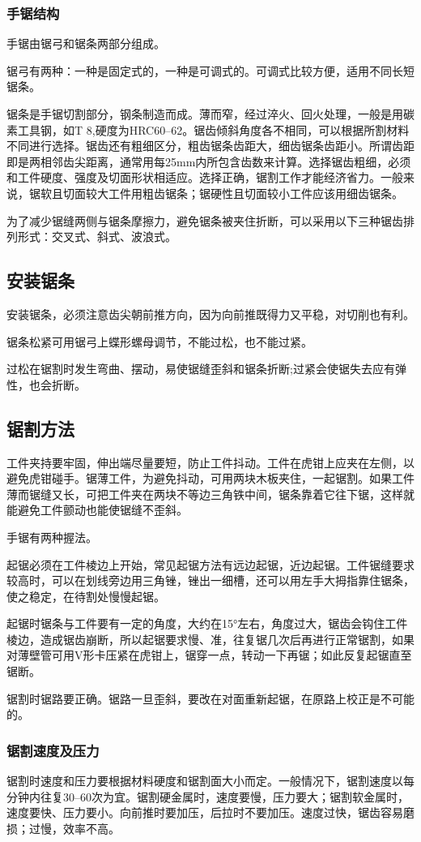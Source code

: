 \documentclass{ctexbook}
\begin{document}
\subsubsection{手锯结构}
手锯由锯弓和锯条两部分组成。

锯弓有两种：一种是固定式的，一种是可调式的。可调式比较方便，适用不同长短锯条。

锯条是手锯切割部分，钢条制造而成。薄而窄，经过淬火、回火处理，一般是用碳素工具钢，如T 8,硬度为HRC60--62。锯齿倾斜角度各不相同，可以根据所割材料不同进行选择。锯齿还有粗细区分，粗齿锯条齿距大，细齿锯条齿距小。所谓齿距即是两相邻齿尖距离，通常用每25mm内所包含齿数来计算。选择锯齿粗细，必须和工件硬度、强度及切面形状相适应。选择正确，锯割工作才能经济省力。一般来说，锯软且切面较大工件用粗齿锯条；锯硬性且切面较小工件应该用细齿锯条。

为了减少锯缝两侧与锯条摩擦力，避免锯条被夹住折断，可以采用以下三种锯齿排列形式：交叉式、斜式、波浪式。
\subsection{安装锯条}
安装锯条，必须注意齿尖朝前推方向，因为向前推既得力又平稳，对切削也有利。

锯条松紧可用锯弓上蝶形螺母调节，不能过松，也不能过紧。

过松在锯割时发生弯曲、摆动，易使锯缝歪斜和锯条折断;过紧会使锯失去应有弹性，也会折断。
\subsection{锯割方法}
工件夹持要牢固，伸出端尽量要短，防止工件抖动。工件在虎钳上应夹在左侧，以避免虎钳碰手。锯薄工件，为避免抖动，可用两块木板夹住，一起锯割。如果工件薄而锯缝又长，可把工件夹在两块不等边三角铁中间，锯条靠着它往下锯，这样就能避免工件颤动也能使锯缝不歪斜。

手锯有两种握法。

起锯必须在工件棱边上开始，常见起锯方法有远边起锯，近边起锯。工件锯缝要求较高时，可以在划线旁边用三角锉，锉出一细槽，还可以用左手大拇指靠住锯条，使之稳定，在待割处慢慢起锯。

起锯时锯条与工件要有一定的角度，大约在15°左右，角度过大，锯齿会钩住工件棱边，造成锯齿崩断，所以起锯要求慢、准，往复锯几次后再进行正常锯割，如果对薄壁管可用V形卡压紧在虎钳上，锯穿一点，转动一下再锯；如此反复起锯直至锯断。

锯割时锯路要正确。锯路一旦歪斜，要改在对面重新起锯，在原路上校正是不可能的。
\subsubsection{锯割速度及压力}
锯割时速度和压力要根据材料硬度和锯割面大小而定。一般情况下，锯割速度以每分钟内往复30--60次为宜。锯割硬金属时，速度要慢，压力要大；锯割软金属时，速度要快、压力要小。向前推时要加压，后拉时不要加压。速度过快，锯齿容易磨损；过慢，效率不高。
\end{document}
